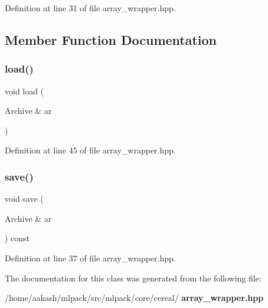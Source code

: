 Definition at line 31 of file array\+\_\+wrapper.\+hpp.



\subsection{Member Function Documentation}
\mbox{\label{classcereal_1_1ArrayWrapper_a27f4b372d3515f81ee63062814c2bbe9}} 
\subsubsection{load()}
{\footnotesize\ttfamily void load (\begin{DoxyParamCaption}\item[{Archive \&}]{ar }\end{DoxyParamCaption})\hspace{0.3cm}{\ttfamily [inline]}}



Definition at line 45 of file array\+\_\+wrapper.\+hpp.

\mbox{\label{classcereal_1_1ArrayWrapper_ad719b5a03421363e973983b4e088ecb3}} 
\subsubsection{save()}
{\footnotesize\ttfamily void save (\begin{DoxyParamCaption}\item[{Archive \&}]{ar }\end{DoxyParamCaption}) const\hspace{0.3cm}{\ttfamily [inline]}}



Definition at line 37 of file array\+\_\+wrapper.\+hpp.



The documentation for this class was generated from the following file\+:\begin{DoxyCompactItemize}
\item 
/home/aakash/mlpack/src/mlpack/core/cereal/\textbf{ array\+\_\+wrapper.\+hpp}\end{DoxyCompactItemize}
